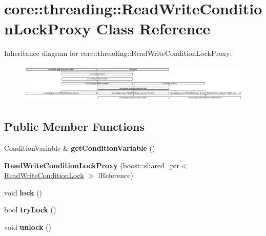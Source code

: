 \hypertarget{classcore_1_1threading_1_1_read_write_condition_lock_proxy}{\section{core\-:\-:threading\-:\-:Read\-Write\-Condition\-Lock\-Proxy Class Reference}
\label{classcore_1_1threading_1_1_read_write_condition_lock_proxy}
}
Inheritance diagram for core\-:\-:threading\-:\-:Read\-Write\-Condition\-Lock\-Proxy\-:\begin{figure}[H]
\begin{center}
\leavevmode
\includegraphics[height=1.861349cm]{classcore_1_1threading_1_1_read_write_condition_lock_proxy}
\end{center}
\end{figure}
\subsection*{Public Member Functions}
\begin{DoxyCompactItemize}
\item 
\hypertarget{classcore_1_1threading_1_1_read_write_condition_lock_proxy_a31828f9ee1c9fc8f74cc4fd7db50fdbe}{Condition\-Variable \& {\bfseries get\-Condition\-Variable} ()}\label{classcore_1_1threading_1_1_read_write_condition_lock_proxy_a31828f9ee1c9fc8f74cc4fd7db50fdbe}

\item 
\hypertarget{classcore_1_1threading_1_1_read_write_condition_lock_proxy_a7ca53dd5fd2f30410cf8337ece860ca6}{{\bfseries Read\-Write\-Condition\-Lock\-Proxy} (boost\-::shared\-\_\-ptr$<$ \hyperlink{classcore_1_1threading_1_1_read_write_condition_lock}{Read\-Write\-Condition\-Lock} $>$ l\-Reference)}\label{classcore_1_1threading_1_1_read_write_condition_lock_proxy_a7ca53dd5fd2f30410cf8337ece860ca6}

\item 
\hypertarget{classcore_1_1threading_1_1_read_write_condition_lock_proxy_ab3e981435d65b4fdc6c231e505f7425f}{void {\bfseries lock} ()}\label{classcore_1_1threading_1_1_read_write_condition_lock_proxy_ab3e981435d65b4fdc6c231e505f7425f}

\item 
\hypertarget{classcore_1_1threading_1_1_read_write_condition_lock_proxy_a660451aff4a1b77e7268a1fd3db3e3e7}{bool {\bfseries try\-Lock} ()}\label{classcore_1_1threading_1_1_read_write_condition_lock_proxy_a660451aff4a1b77e7268a1fd3db3e3e7}

\item 
\hypertarget{classcore_1_1threading_1_1_read_write_condition_lock_proxy_a77b08a146fff2b985790aa2845de1143}{void {\bfseries unlock} ()}\label{classcore_1_1threading_1_1_read_write_condition_lock_proxy_a77b08a146fff2b985790aa2845de1143}

\end{DoxyCompactItemize}
